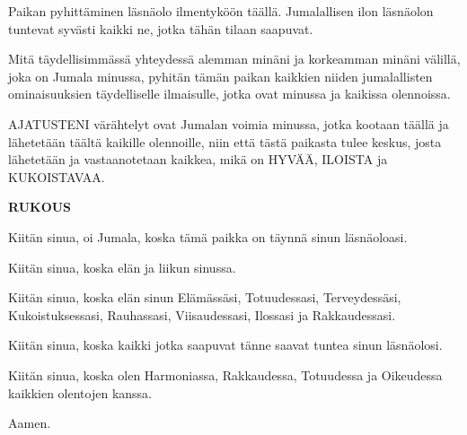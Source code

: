 \begin{passage}[FI]{Paikan pyhittäminen}
    läsnäolo ilmentyköön täällä. Jumalallisen ilon
    läsnäolon tuntevat syvästi kaikki ne, jotka tähän
    tilaan saapuvat.
    \par
    Mitä täydellisimmässä yhteydessä alemman minäni ja
    korkeamman minäni välillä, joka on Jumala minussa,
    pyhitän tämän paikan kaikkien niiden jumalallisten
    ominaisuuksien täydelliselle ilmaisulle, jotka ovat
    minussa ja kaikissa olennoissa.
    \par
    AJATUSTENI värähtelyt ovat Jumalan voimia minussa,
    jotka kootaan täällä ja lähetetään täältä kaikille
    olennoille, niin että tästä paikasta tulee keskus,
    josta lähetetään ja vastaanotetaan kaikkea, mikä on
    HYVÄÄ, ILOISTA ja KUKOISTAVAA.
    \par
    \vspace{1ex}
    \textbf{RUKOUS}
    \par
    Kiitän sinua, oi Jumala, koska tämä paikka on täynnä
    sinun läsnäoloasi.
    \par
    Kiitän sinua, koska elän ja liikun sinussa.
    \par
    Kiitän sinua, koska elän sinun Elämässäsi, Totuudessasi,
    Terveydessäsi, Kukoistuksessasi, Rauhassasi,
    Viisaudessasi, Ilossasi ja Rakkaudessasi.
    \par
    Kiitän sinua, koska kaikki jotka saapuvat tänne saavat
    tuntea sinun läsnäolosi.
    \par
    Kiitän sinua, koska olen Harmoniassa, Rakkaudessa,
    Totuudessa ja Oikeudessa kaikkien olentojen kanssa.
    \par
    Aamen.
  \end{passage}
\endsong
